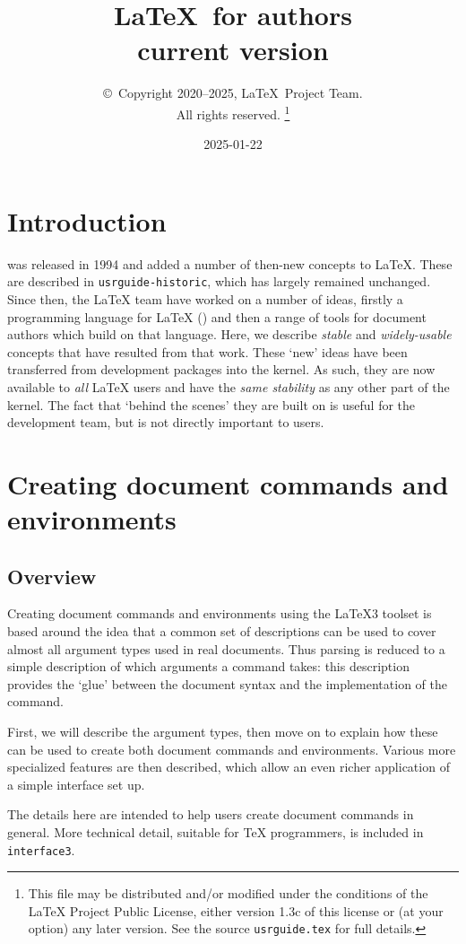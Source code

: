 \documentclass{ltxguide}
\title{\LaTeX\ for authors\\ current version}
\author{\copyright~Copyright 2020--2025, \LaTeX\ Project Team.\\
   All rights reserved.%
   \footnote{This file may be distributed and/or modified under the
     conditions of the \LaTeX{} Project Public License, either version 1.3c
     of this license or (at your option) any later version. See the source
    \texttt{usrguide.tex} for full details.}%
}
\date{2025-01-22}
\begin{document}
\maketitle

\tableofcontents

\section{Introduction}

\LaTeXe{} was released in 1994 and added a number of then-new concepts to
\LaTeX{}. These are described in \texttt{usrguide-historic}, which has largely remained
unchanged. Since then, the \LaTeX{} team have worked on a number of ideas,
firstly a programming language for \LaTeX{} () and then a range of
tools for document authors which build on that language. Here, we describe
\emph{stable} and \emph{widely-usable} concepts that have resulted from that
work. These `new' ideas have been transferred from development packages
into the \LaTeXe{} kernel. As such, they are now available to \emph{all}
\LaTeX{} users and have the \emph{same stability} as any other part of the
kernel. The fact that `behind the scenes' they are built on 
is useful for the development team, but is not directly important to users.

\section{Creating document commands and environments}

\subsection{Overview}

Creating document commands and environments using the \LaTeX3 toolset is based
around the idea that a common set of descriptions can be used to cover almost
all argument types used in real documents. Thus parsing is reduced to a simple
description of which arguments a command takes: this description provides the
`glue' between the document syntax and the implementation of the
command.

First, we will describe the argument types, then move on to explain how these
can be used to create both document commands and environments. Various more
specialized features are then described, which allow an even richer application
of a simple interface set up.

The details here are intended to help users create document commands in
general. More technical detail, suitable for \TeX{} programmers, is included
in \texttt{interface3}.
\end{document}
